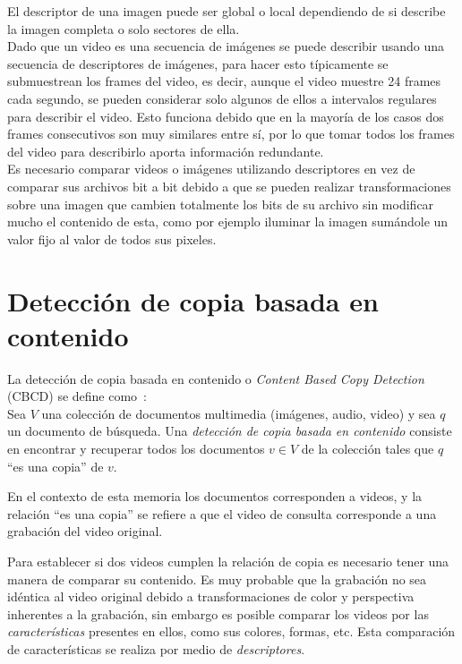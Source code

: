 El descriptor de una imagen puede ser global o local dependiendo de si describe la imagen completa o solo sectores de ella. \\
Dado que un video es una secuencia de imágenes se puede describir usando una secuencia de descriptores de imágenes, para hacer esto típicamente se submuestrean los frames del video, es decir, aunque el video muestre 24 frames cada segundo, se pueden considerar solo algunos de ellos a intervalos regulares para describir el video. Esto funciona debido que en la mayoría de los casos dos frames consecutivos son muy similares entre sí, por lo que tomar todos los frames del video para describirlo aporta información redundante.\\
Es necesario comparar videos o imágenes utilizando descriptores en vez de comparar sus archivos bit a bit debido a que se pueden realizar transformaciones sobre una imagen que cambien totalmente los bits de su archivo sin modificar mucho el contenido de esta, como por ejemplo iluminar la imagen sumándole un valor fijo al valor de todos sus pixeles.

\section{Detección de copia basada en contenido}\label{copias}

La detección de copia basada en contenido o \emph{Content Based Copy Detection} (CBCD) se define como~\cite{tesis}: \\
Sea $V$ una colección de documentos multimedia (imágenes, audio, video) y sea $q$ un documento de búsqueda. Una \emph{detección de copia basada en contenido} consiste en encontrar y recuperar todos los documentos $v \in V$ de la colección tales que $q$ ``es una copia'' de $v$.

En el contexto de esta memoria los documentos corresponden a videos, y la relación ``es una copia'' se refiere a que el video de consulta corresponde a una grabación del video original.

Para establecer si dos videos cumplen la relación de copia es necesario tener una manera de comparar su contenido. Es muy probable que la grabación no sea idéntica al video original debido a transformaciones de color y perspectiva inherentes a la grabación, sin embargo es posible comparar los videos por las \textit{características} presentes en ellos, como sus colores, formas, etc. Esta comparación de características se realiza por medio de \emph{descriptores}.


